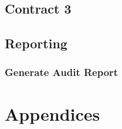 \documentclass[12pt]{article}
\begin{document}
                	\subsection{Contract 3}
                	
                  	\subsection{Reporting}
                  	
                  		\subsubsection{Generate Audit Report}
                
                
                
                \section{Appendices}
        
                
                        
        
        
\end{document}
